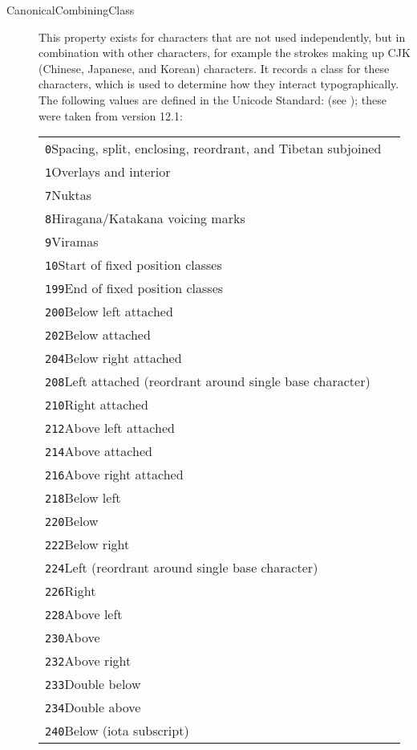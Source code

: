 \begin{description}
\item[{Canonical\textunderscore Combining\textunderscore Class}]This property exists for characters that are not used independently, but in combination with other characters, for example the strokes making up CJK (Chinese, Japanese, and Korean) characters. It records a class for these characters, which is used to determine how they interact typographically. The following values are defined in the Unicode Standard: (see ); these were taken from version 12.1:  \par 
\begin{longtable}{P{0.3071428571428571\textwidth}P{0.5428571428571428\textwidth}}
\texttt{0}\tabcellsep Spacing, split, enclosing, reordrant, and Tibetan subjoined \\
\texttt{1}\tabcellsep Overlays and interior \\
\texttt{7}\tabcellsep Nuktas \\
\texttt{8}\tabcellsep Hiragana/Katakana voicing marks \\
\texttt{9}\tabcellsep Viramas \\
\texttt{10}\tabcellsep Start of fixed position classes \\
\texttt{199}\tabcellsep End of fixed position classes \\
\texttt{200}\tabcellsep Below left attached \\
\texttt{202}\tabcellsep Below attached \\
\texttt{204}\tabcellsep Below right attached \\
\texttt{208}\tabcellsep Left attached (reordrant around single base character) \\
\texttt{210}\tabcellsep Right attached \\
\texttt{212}\tabcellsep Above left attached \\
\texttt{214}\tabcellsep Above attached \\
\texttt{216}\tabcellsep Above right attached \\
\texttt{218}\tabcellsep Below left \\
\texttt{220}\tabcellsep Below \\
\texttt{222}\tabcellsep Below right \\
\texttt{224}\tabcellsep Left (reordrant around single base character) \\
\texttt{226}\tabcellsep Right \\
\texttt{228}\tabcellsep Above left \\
\texttt{230}\tabcellsep Above \\
\texttt{232}\tabcellsep Above right \\
\texttt{233}\tabcellsep Double below \\
\texttt{234}\tabcellsep Double above \\
\texttt{240}\tabcellsep Below (iota subscript) \end{longtable} \par
 

\end{description}
